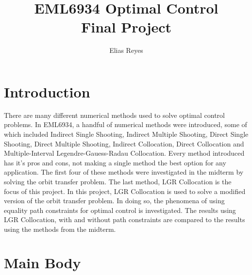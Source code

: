 \documentclass[]{article}
\title{EML6934 Optimal Control \\ Final Project}
\author{Elias Reyes}
\begin{document}
	
	\maketitle
	\thispagestyle{empty}
	\newpage
	\newpage
	\tableofcontents
	\newpage
	\listoffigures
	\listoftables
	\newpage
	\lstlistoflistings
	\newpage
	
	\section{Introduction}
	There are many different numerical methods used to solve optimal control problems. In EML6934, a handful of numerical methods were introduced, some of which included Indirect Single Shooting, Indirect Multiple Shooting, Direct Single Shooting, Direct Multiple Shooting, Indirect Collocation, Direct Collocation and Multiple-Interval Legendre-Gauess-Radau Collocation. Every method introduced has it's pros and cons, not making a single method the best option for any application. The first four of these methods were investigated in the midterm by solving the orbit transfer problem. The last method, LGR Collocation is the focus of this project. In this project, LGR Collocation is used to solve a modified version of the orbit transfer problem. In doing so, the phenomena of using equality path constraints for optimal control is investigated. The results using LGR Collocation, with and without path constraints are compared to the results using the methods from the midterm. 
	\section{Main Body}
\end{document}
